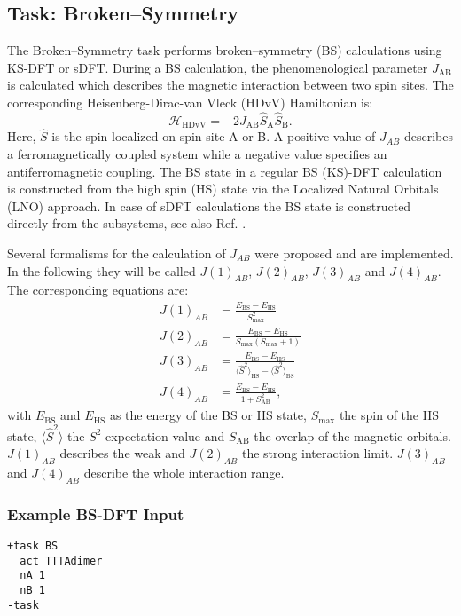 \subsection{Task: Broken--Symmetry\label{task:brokensymmetry}}
The Broken--Symmetry task performs broken--symmetry (BS) calculations using KS-DFT
or sDFT. During a BS calculation, the phenomenological parameter $J_\text{AB}$ is calculated
which describes the magnetic interaction between two spin sites. The corresponding 
Heisenberg-Dirac-van Vleck (HDvV) Hamiltonian is:
\begin{equation}
	\mathcal{H}_\text{HDvV} = -2J_\text{AB} \hat{S}_\text{A} \hat{S}_\text{B}.
\end{equation}
Here, $\hat{S}$ is the spin localized on spin site A or B. A positive value of $J_{AB}$ describes
a ferromagnetically coupled system while a negative value specifies an antiferromagnetic coupling.
The BS state in a regular BS (KS)-DFT calculation is constructed from the high spin (HS) 
state via the Localized Natural Orbitals (LNO) approach\cite{shoji2014}. In case of sDFT
calculations the BS state is constructed directly from the subsystems, see also Ref. \cite{massolle2020}.

Several formalisms for the calculation of $J_{AB}$ were proposed and are implemented. In the
following they will be called $J(1)_{AB}$\cite{ginsberg1980, noodleman1981, noodleman1986},
$J(2)_{AB}$\cite{bencini1986}, $J(3)_{AB}$\cite{yamaguchi1986, soda2000} and $J(4)_{AB}$\cite{noodleman1981}. The corresponding equations are:
\begin{align}
	J(1)_{AB} &= \frac{E_\text{BS}-E_\text{HS}}{S_\text{max}^2}\\
	J(2)_{AB} &= \frac{E_\text{BS}-E_\text{HS}}{S_\text{max} (S_\text{max} +1)}\\
	J(3)_{AB} &= \frac{E_\text{BS}-E_\text{HS}}{\langle \hat{S}^2\rangle_\text{HS} - \langle \hat{S}^2\rangle_\text{BS}}\\
	J(4)_{AB} &= \frac{E_\text{BS}-E_\text{HS}}{1 + S_\text{AB}^2},
\end{align}
with $E_\text{BS}$ and $E_\text{HS}$ as the energy of the BS or HS state, $S_\text{max}$
the spin of the HS state, $\langle \hat{S}^2\rangle$ the $S^2$ expectation value and $S_\text{AB}$ the overlap
of the magnetic orbitals. $J(1)_{AB}$ describes the weak and $J(2)_{AB}$ the
strong interaction limit. $J(3)_{AB}$ and $J(4)_{AB}$ describe the whole interaction range.

\subsubsection{Example BS-DFT Input}
\begin{lstlisting}
+task BS
  act TTTAdimer
  nA 1
  nB 1
-task
\end{lstlisting}

